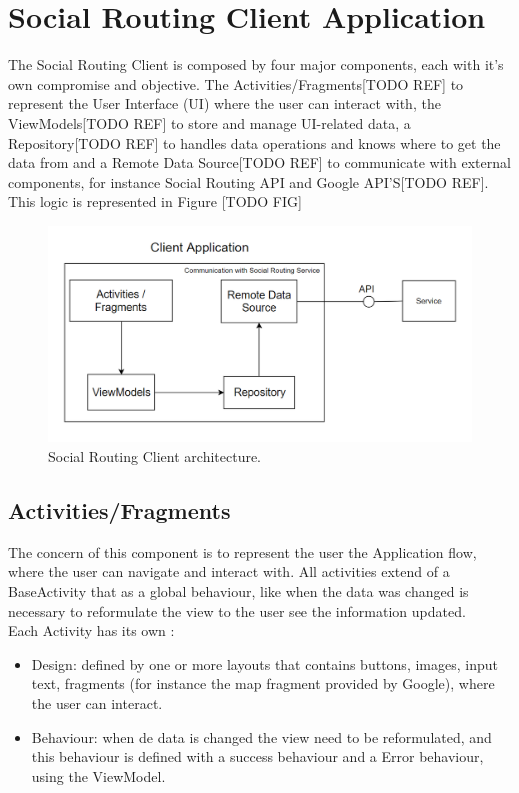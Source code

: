 \chapter{Social Routing Client Application}
The Social Routing Client is composed by four major components, each with it's own compromise and objective.
The Activities/Fragments[TODO REF] to represent the User Interface (UI) where the user can interact with, the ViewModels[TODO REF] to store
and manage UI-related data, a Repository[TODO REF] to handles data operations and knows where to get the data from and a 
Remote Data Source[TODO REF] to communicate with external components, for instance Social Routing API and Google API'S[TODO REF]. 
This logic is represented in Figure [TODO FIG]

\begin{figure}[h]            
        \includegraphics[width=\textwidth]{images/project-structure/social-routing-client-application-structure.PNG}
        \caption{Social Routing Client architecture.}
\end{figure}

\section*{Activities/Fragments}
The concern of this component is to represent the user the Application flow, where the user can navigate and interact with.
All activities extend of a BaseActivity that as a global behaviour, like when the data was changed is necessary to reformulate the view to the user see the 
information updated. \\

Each Activity has its own :
\begin{itemize}
        \item Design: defined by one or more layouts that contains buttons, images, input text, fragments (for instance the map fragment provided by Google), where the user can interact.
        \item Behaviour: when de data is changed the view need to be reformulated, and this behaviour is defined with a success behaviour and a Error behaviour, using the ViewModel.
\end{itemize}

